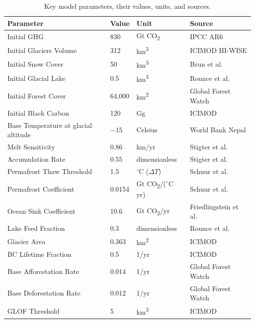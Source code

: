 \documentclass[12pt, a4paper]{article}
\begin{document}
\begin{table}[H]
    \centering
    \renewcommand{\arraystretch}{1.3}
    \begin{tabular}{|p{4.5cm}|p{2.2cm}|p{2.2cm}|p{5.5cm}|}
        \hline
        \textbf{Parameter} & \textbf{Value} & \textbf{Unit} & \textbf{Source} \\
        \hline
        Initial GHG & 830 & Gt CO\textsubscript{2} & IPCC AR6 \cite{ipcc2021} \\
        Initial Glaciers Volume & 312 & km\textsuperscript{3} & ICIMOD HI-WISE \cite{icimod2023} \\
        Initial Snow Cover & 50 & km\textsuperscript{3} & Brun et al. \cite{brun2017} \\
        Initial Glacial Lake & 0.5 & km\textsuperscript{3} & Rounce et al. \cite{rounce2020} \\
        Initial Forest Cover & 64,000 & km\textsuperscript{2} & Global Forest Watch \cite{gfw2024} \\
        Initial Black Carbon & 120 & Gg & ICIMOD \cite{icimod2021} \\
        Base Temperature at glacial altitude & $-15$ & Celsius & World Bank Nepal \cite{worldbank2021} \\
        Melt Sensitivity & 0.86 & km/yr & Stigter et al. \cite{stigter2021} \\
        Accumulation Rate & 0.55 & dimensionless & Stigter et al. \cite{stigter2021} \\
        Permafrost Thaw Threshold & 1.5 & $^\circ$C ($\Delta T$) & Schuur et al. \cite{schuur2015} \\
        Permafrost Coefficient & 0.0154 & Gt CO\textsubscript{2}/($^\circ$C yr) & Schuur et al. \cite{schuur2015} \\
        Ocean Sink Coefficient & 10.6 & Gt CO\textsubscript{2}/yr & Friedlingstein et al. \cite{friedlingstein2022} \\
        Lake Feed Fraction & 0.3 & dimensionless & Rounce et al. \cite{rounce2020} \\
        Glacier Area & 0.363 & km\textsuperscript{2} & ICIMOD \cite{icimod2023} \\
        BC Lifetime Fraction & 0.5 & 1/yr & ICIMOD \cite{icimod2021} \\
        Base Afforestation Rate & 0.014 & 1/yr & Global Forest Watch \cite{gfw2024} \\
        Base Deforestation Rate & 0.012 & 1/yr & Global Forest Watch \cite{gfw2024} \\
        GLOF Threshold & 5 & km\textsuperscript{3} & ICIMOD \cite{icimod2023} \\
        \hline
    \end{tabular}
    \caption{Key model parameters, their values, units, and sources.}
    \label{tab:params}
\end{table}
\end{document}
